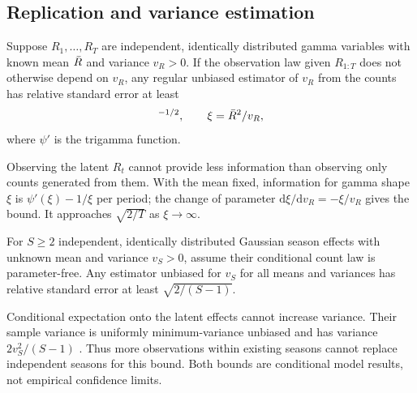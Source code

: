 \subsection{Replication and variance estimation}
\label{app:vr-precision}
\label{app:seasons}

\begin{proposition}
\label{prop:vr-precision}
Suppose $R_1,\ldots,R_T$ are independent, identically distributed gamma variables with known mean $\bar R$ and variance $v_R>0$. If the observation law given $R_{1:T}$ does not otherwise depend on $v_R$, any regular unbiased estimator of $v_R$ from the counts has relative standard error at least
\begin{equation}
 [T\xi(\xi\psi'(\xi)-1)]^{-1/2},\qquad \xi=\Rbar^2/v_R,
 \label{eq:vr-bound}
\end{equation}
where $\psi'$ is the trigamma function.
\end{proposition}

Observing the latent $R_t$ cannot provide less information than observing only counts generated from them. With the mean fixed, information for gamma shape $\xi$ is $\psi'(\xi)-1/\xi$ per period; the change of parameter $\mathrm d\xi/\mathrm dv_R=-\xi/v_R$ gives the bound. It approaches $\sqrt{2/T}$ as $\xi\to\infty$.

\begin{corollary}
\label{cor:season}
For $S\ge2$ independent, identically distributed Gaussian season effects with unknown mean and variance $v_S>0$, assume their conditional count law is parameter-free. Any estimator unbiased for $v_S$ for all means and variances has relative standard error at least $\sqrt{2/(S-1)}$.
\end{corollary}

Conditional expectation onto the latent effects cannot increase variance. Their sample variance is uniformly minimum-variance unbiased and has variance $2v_S^2/(S-1)$ \citep{lehmann1998theory, searle1992variance}. Thus more observations within existing seasons cannot replace independent seasons for this bound. Both bounds are conditional model results, not empirical confidence limits.

\FloatBarrier
\clearpage
\renewcommand{\thetable}{S\arabic{table}}
\setcounter{table}{0}
\renewcommand{\thefigure}{S\arabic{figure}}
\setcounter{figure}{0}

